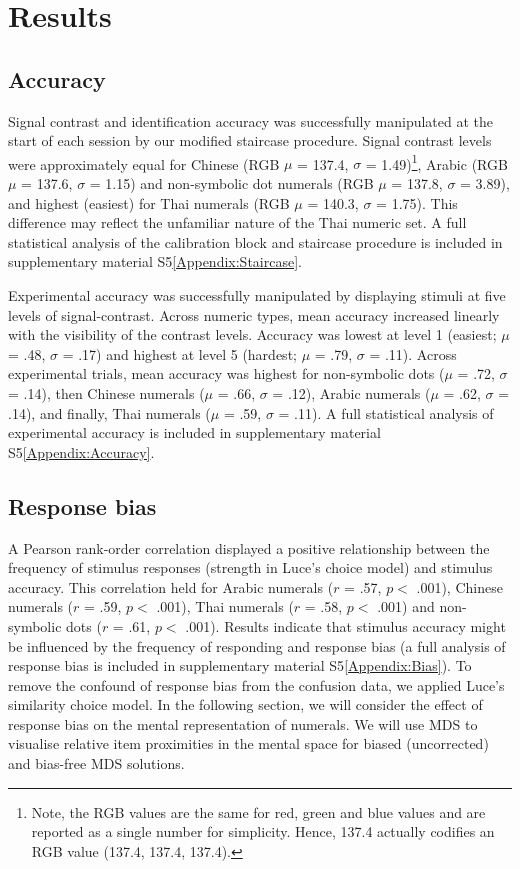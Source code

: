 \section{Results}
\subsection{Accuracy}
Signal contrast and identification accuracy was successfully manipulated at the start of each session by our modified staircase procedure. Signal contrast levels were approximately equal for Chinese (RGB $\mu$ = 137.4, $\sigma$ = 1.49)\footnote{Note, the RGB values are the same for red, green and blue values and are reported as a single number for simplicity. Hence, 137.4 actually codifies an RGB value (137.4, 137.4, 137.4).}, Arabic (RGB $\mu$ = 137.6, $\sigma$ = 1.15) and non-symbolic dot numerals (RGB $\mu$ = 137.8, $\sigma$ = 3.89), and highest (easiest) for Thai numerals (RGB $\mu$ = 140.3, $\sigma$ = 1.75). This difference may reflect the unfamiliar nature of the Thai numeric set. A full statistical analysis of the calibration block and staircase procedure is included in supplementary material S5\ref{Appendix:Staircase}.

Experimental accuracy was successfully manipulated by displaying stimuli at five levels of signal-contrast. Across numeric types, mean accuracy increased linearly with the visibility of the contrast levels. Accuracy was lowest at level 1 (easiest; $\mu$ = .48, $\sigma$ = .17) and highest at level 5 (hardest; $\mu$ = .79, $\sigma$ = .11). Across experimental trials, mean accuracy was highest for non-symbolic dots ($\mu$ = .72, $\sigma$ = .14), then Chinese numerals ($\mu$ = .66, $\sigma$ = .12), Arabic numerals ($\mu$ = .62, $\sigma$ = .14), and finally, Thai numerals ($\mu$ = .59, $\sigma$ = .11). A full statistical analysis of experimental accuracy is included in supplementary material S5\ref{Appendix:Accuracy}.

\subsection{Response bias}
A Pearson rank-order correlation displayed a positive relationship between the frequency of stimulus responses (strength in Luce's choice model) and stimulus accuracy. This correlation held for Arabic numerals ($r$ = .57, $p < $ .001), Chinese numerals ($r$ = .59, $p < $ .001), Thai numerals ($r$ = .58, $p < $ .001) and non-symbolic dots ($r$ = .61, $p < $ .001). Results indicate that stimulus accuracy might be influenced by the frequency of responding and response bias (a full analysis of response bias is included in supplementary material S5\ref{Appendix:Bias}). To remove the confound of response bias from the confusion data, we applied Luce's similarity choice model. In the following section, we will consider the effect of response bias on the mental representation of numerals. We will use MDS to visualise relative item proximities in the mental space for biased (uncorrected) and bias-free MDS solutions.

